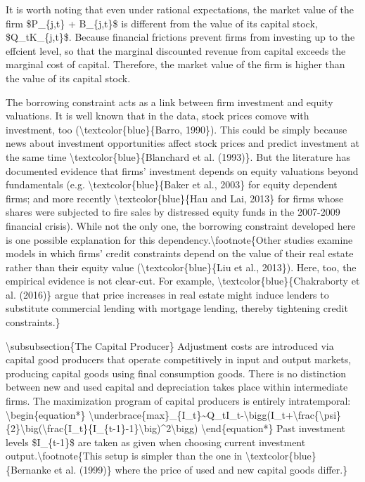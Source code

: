 \documentclass[10pt,math=newtx,citestyle=gb7714-2015,bibstyle=gb7714-2015]{elegantbook}
\begin{document}
	It is worth noting that even under rational expectations, the market value of the firm \$P\_\{j,t\} + B\_\{j,t\}\$ is different from the value of its capital stock, \$Q\_tK\_\{j,t\}\$. Because financial frictions prevent firms from investing up to the effcient level, so that the marginal discounted revenue from capital exceeds the
	marginal cost of capital. Therefore, the market value of the firm is higher than the value of its capital stock.
	
	The borrowing constraint acts as a link between firm investment and equity valuations. It is well known that in the data, stock prices comove with investment, too (\textbackslash{}textcolor\{blue\}\{Barro, 1990\}). This could be simply because news about investment opportunities affect stock prices and predict investment
	at the same time \textbackslash{}textcolor\{blue\}\{Blanchard et al. (1993)\}. But the literature has documented evidence that firms' investment depends on equity valuations beyond fundamentals (e.g. \textbackslash{}textcolor\{blue\}\{Baker et al., 2003\} for equity dependent firms; and more recently \textbackslash{}textcolor\{blue\}\{Hau and Lai, 2013\} for firms whose shares were subjected to fire sales by distressed equity funds in the 2007-2009 financial crisis). While not the only one, the borrowing constraint developed here is one possible explanation for this dependency.\textbackslash{}footnote\{Other studies examine models in which firms' credit constraints depend on the value of their real estate rather than their equity value (\textbackslash{}textcolor\{blue\}\{Liu et al., 2013\}). Here, too, the empirical evidence is not clear-cut. For example, \textbackslash{}textcolor\{blue\}\{Chakraborty et al. (2016)\} argue that price increases in real estate might induce lenders to substitute commercial lending with mortgage lending, thereby tightening credit constraints.\}
	
	\textbackslash{}subsubsection\{The Capital Producer\}
	Adjustment costs are introduced via capital good producers that operate competitively in input and output markets, producing capital goods using final consumption goods. There is no distinction between new and used capital and depreciation takes place within intermediate firms. The maximization program of capital producers is entirely intratemporal:
	\textbackslash{}begin\{equation*\}
	\textbackslash{}underbrace\{max\}\_\{I\_t\}\~{}Q\_tI\_t-\textbackslash{}bigg(I\_t+\textbackslash{}frac\{\textbackslash{}psi\}\{2\}\textbackslash{}big(\textbackslash{}frac\{I\_t\}\{I\_\{t-1\}-1\}\textbackslash{}big)\^{}2\textbackslash{}bigg)
	\textbackslash{}end\{equation*\}
	Past investment levels \$I\_\{t-1\}\$ are taken as given when choosing current investment output.\textbackslash{}footnote\{This setup is simpler than the one in \textbackslash{}textcolor\{blue\}\{Bernanke et al. (1999)\} where the price of used and new capital goods differ.\}
	
\end{document}
